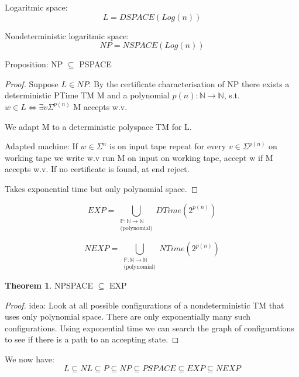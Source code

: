 \documentclass[a4paper,12pt]{article}
\theoremstyle{definition}
\newtheorem{theorem}[counter]{Theorem}
\theoremstyle{remark}
\newcommand{\N}{\mathbb{N}}
\newcommand{\Pp}{\mathbb{P}}
\begin{document}
Logaritmic space:
\begin{equation*}
    L = DSPACE(Log(n))
\end{equation*}

Nondeterministic logaritmic space:
\begin{equation*}
    NP = NSPACE(Log(n))
\end{equation*}


Proposition: NP $\subseteq$ PSPACE

\begin{proof}
    Suppose $L \in NP$. By the certificate characterisation of NP there exists a deterministic PTime TM M
    and a polynomial $p(n): \N \to \N$, s.t. $w \in L \iff \exists v \Sigma^{p(n)}$ M accepts w.v.

    We adapt M to a deterministic polyspace TM for L.

    Adapted machine:
    If $w \in \Sigma^n$ is on input tape repeat for every $v \in \Sigma^{p(n)}$ on working tape we write w.v run M on input on working tape, accept 
    w if M accepts w.v. If no certificate is found, at end reject.

    Takes exponential time but only polynomial space.
\end{proof}

\begin{equation*}
    EXP = \bigcup_{\substack{\Pp: \N \to \N \\ \text{(polynomial)}}} DTime(2^{p(n)})
\end{equation*}

\begin{equation*}
    NEXP = \bigcup_{\substack{\Pp: \N \to \N \\ \text{(polynomial)}}} NTime(2^{p(n)})
\end{equation*}


\begin{theorem}
    NPSPACE $\subseteq$ EXP
\end{theorem}

\begin{proof}
    idea: Look at all possible configurations of a nondeterministic TM that uses only polynomial space.
    There are only exponentially many such configurations. Using exponential time we can search the graph of configurations to see
    if there is a path to an accepting state.
\end{proof}

We now have:
\begin{equation*}
    L \subseteq NL \subseteq P \subseteq NP \subseteq PSPACE \subseteq EXP \subseteq NEXP
\end{equation*}
\end{document}
